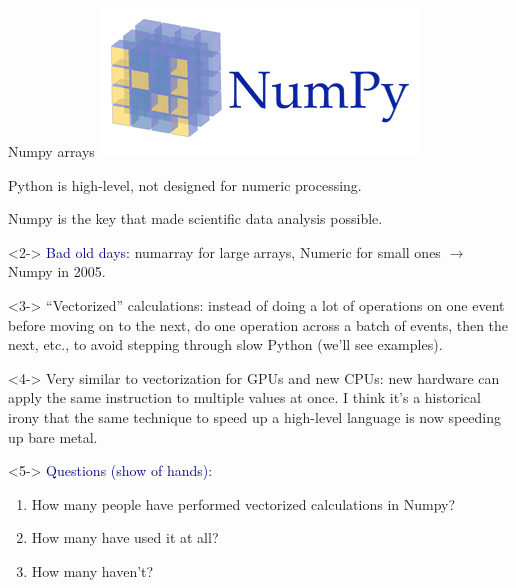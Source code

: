 \documentclass[aspectratio=169]{beamer}
\begin{document}
\begin{frame}{Numpy arrays}
\vspace{0.5 cm}
\hfill \includegraphics[height=1.3 cm]{numpy-logo.png}

\vspace{-1.3 cm}

Python is high-level, not designed for numeric processing.

Numpy is the key that made scientific data analysis possible.

\vspace{0.25 cm}
\begin{uncoverenv}<2->
\textcolor{darkblue}{Bad old days:} numarray for large arrays, Numeric for small ones $\to$ Numpy in 2005.
\end{uncoverenv}

\vspace{0.25 cm}
\begin{uncoverenv}<3->
``Vectorized'' calculations: instead of doing a lot of operations on one event before moving on to the next, do one operation across a batch of events, then the next, etc., to avoid stepping through slow Python (we'll see examples).
\end{uncoverenv}

\vspace{0.25 cm}
\begin{uncoverenv}<4->
Very similar to vectorization for GPUs and new CPUs: new hardware can apply the same instruction to multiple values at once. I think it's a historical irony that the same technique to speed up a high-level language is now speeding up bare metal.
\end{uncoverenv}

\vspace{0.25 cm}
\begin{uncoverenv}<5->
\small
\textcolor{darkblue}{Questions (show of hands):}
\vspace{-0.2 cm}
\begin{enumerate}\setlength{\itemsep}{-0.1 cm}
\item How many people have performed vectorized calculations in Numpy?
\item How many have used it at all?
\item How many haven't?
\end{enumerate}
\end{uncoverenv}
\end{frame}
\end{document}
